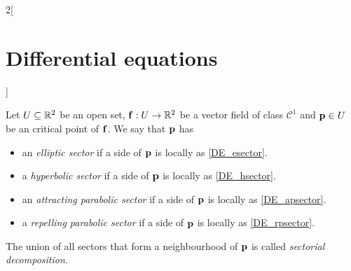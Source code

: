 \documentclass[../../../main.tex]{subfiles}
\begin{document}
\begin{multicols}{2}[\section{Differential equations}]
\begin{definition}
  \end{definition}
  \begin{center}
    \begin{minipage}{\linewidth}
      \centering
      
    \end{minipage}
  \end{center}
  \begin{definition}
    Let $U\subseteq \mathbb{R}^2$ be an open set, $\boldsymbol{\mathrm{f}}:U\rightarrow\mathbb{R}^2$ be a vector field of class $\mathcal{C}^1$ and $\boldsymbol{\mathrm{p}}\in U$ be an critical point of $\boldsymbol{\mathrm{f}}$. We say that $\boldsymbol{\mathrm{p}}$ has
    \begin{itemize}
      \item an \emph{elliptic sector} if a side of $\boldsymbol{\mathrm{p}}$ is locally as \cref{DE_esector}.
      \item a \emph{hyperbolic sector} if a side of $\boldsymbol{\mathrm{p}}$ is locally as \cref{DE_hsector}.
      \item  an \emph{attracting parabolic sector} if a side of $\boldsymbol{\mathrm{p}}$ is locally as \cref{DE_apsector}.
      \item a \emph{repelling parabolic sector} if a side of $\boldsymbol{\mathrm{p}}$ is locally as \cref{DE_rpsector}.
    \end{itemize}
    The union of all sectors that form a neighbourhood of $\boldsymbol{\mathrm{p}}$ is called \emph{sectorial decomposition}.
    \begin{center}
      \begin{minipage}[b]{0.475\linewidth}
        \centering
        
        \label{DE_esector}
      \end{minipage}\hfill
      \begin{minipage}[b]{0.475\linewidth}
        \centering
        
        \label{DE_hsector}
      \end{minipage}
    \end{center}
    \begin{center}
      \begin{minipage}[b]{0.475\linewidth}
        \centering
        

\end{minipage}
\end{center}
\end{definition}
\end{multicols}
\end{document}
